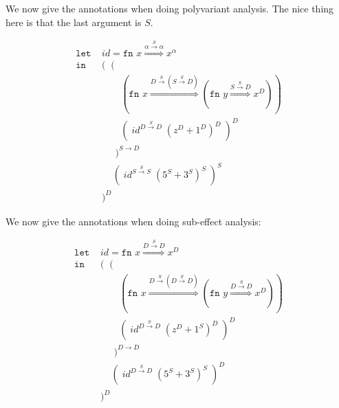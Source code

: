 \documentclass[a4wide,12pt]{article}
\theoremstyle{definition}
\theoremstyle{plain}
\theoremstyle{remark}
\begin{document}
We now give the annotations when doing polyvariant analysis. The nice thing here
is that the last argument is $S$.

\begin{align*}
\texttt{let } & id = \texttt{fn } x \overset{\alpha \overset{S}{\to} \alpha}{\Rightarrow} x^{\alpha} \\
\texttt{in } & (\;\;( \\
             & \;\;\;\;\;\;\;(\texttt{fn } x \overset{D \overset{S}{\to} (S \overset{S}{\to} D)}{\Rightarrow} (\texttt{fn } y
             \overset{S \overset{S}{\to} D}{\Rightarrow} x^{D})) \\
             & \;\;\;\;\;\;\;(\;id^{D \overset{S}{\to} D} \; (z^{D} + 1^{D})^{D}\;)^{D}  \\
             & \;\;\;\;\;)^{S \to D} \\
             & \;\;\;\;(\;id^{S \overset{S}{\to} S} \; (5^{S} + 3^{S})^{S}\;)^{S}   \\
             & )^{D}
\end{align*}

We now give the annotations when doing sub-effect analysis:

\begin{align*}
\texttt{let } & id = \texttt{fn } x \overset{D \overset{S}{\to} D}{\Rightarrow} x^{D} \\
\texttt{in } & (\;\;( \\
             & \;\;\;\;\;\;\;(\texttt{fn } x \overset{D \overset{S}{\to} (D \overset{S}{\to} D)}{\Rightarrow} (\texttt{fn } y
             \overset{D \overset{S}{\to} D}{\Rightarrow} x^{D})) \\
             & \;\;\;\;\;\;\;(\;id^{D \overset{S}{\to} D} \; (z^{D} + 1^{S})^{D}\;)^{D}  \\
             & \;\;\;\;\;)^{D \to D} \\
             & \;\;\;\;(\;id^{D \overset{S}{\to} D} \; (5^{S} + 3^{S})^{S}\;)^{D}   \\
             & )^{D}
\end{align*}
\end{document}
